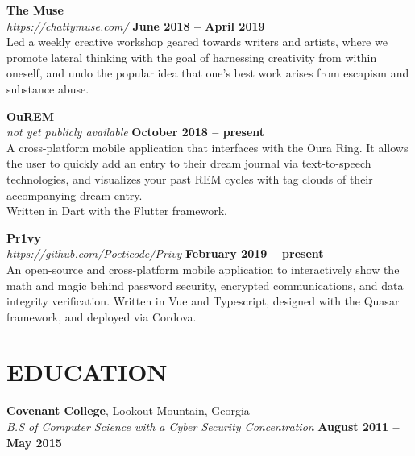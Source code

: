 \documentclass[margin,line]{resume}
\begin{document}
\begin{resume}
    \textbf{\listing The Muse}\\
    \textsl{https://chattymuse.com/} \hfill \textbf{June 2018 -- April 2019}\\
    Led a weekly creative workshop geared towards writers and artists, where we promote lateral thinking with the goal of harnessing creativity from within oneself, and undo the popular idea that one's best work arises from escapism and substance abuse.

    \textbf{\listing OuREM}\\
    \textsl{not yet publicly available} \hfill \textbf{October 2018 -- present}\\
    A cross-platform mobile application that interfaces with the Oura Ring. It allows the user to quickly add an entry to their dream journal via text-to-speech technologies, and visualizes your past REM cycles with tag clouds of their accompanying dream entry.\\
    Written in Dart with the Flutter framework.

    \textbf{\listing Pr1vy}\\
    \textsl{https://github.com/Poeticode/Privy} \hfill \textbf{February 2019 -- present}\\
    An open-source and cross-platform mobile application to interactively show the math and magic behind password security, encrypted communications, and data integrity verification. Written in Vue and Typescript, designed with the Quasar framework, and deployed via Cordova.

    \vspace{-1mm}

\sectionline


    \section{\mysidestyle \textbf{\large{E}\small{DUCATION}}}

    \textbf{\listing Covenant College}, Lookout Mountain, Georgia \vspace{1mm}\\
    \textsl{B.S of Computer Science with a Cyber Security Concentration} \hfill \textbf{August 2011 -- May 2015}\vspace{-3mm}\\\vspace{-1mm}%


\end{resume}
\end{document}
